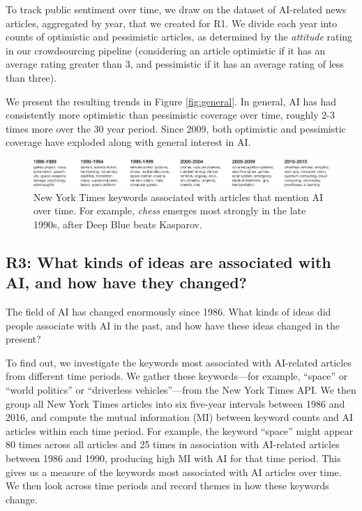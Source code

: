 \documentclass[letterpaper]{article}
\begin{document}
To track public sentiment over time, we draw on the dataset of AI-related news articles, aggregated by year, that we created for R1. We divide each year into counts of optimistic and pessimistic articles, as determined by the \textit{attitude} rating in our crowdsourcing pipeline (considering an article optimistic if it has an average rating greater than 3, and pessimistic if it has an average rating of less than three). %

We present the resulting trends in Figure \ref{fig:general}. In general, AI has had consistently more optimistic than pessimistic coverage over time, roughly 2-3 times more over the 30 year period. Since 2009, both optimistic and pessimistic coverage have exploded along with general interest in AI.

\begin{figure}[!t]
\centering
\includegraphics[width=2.0\columnwidth]{topics-over-time}
\caption{New York Times keywords associated with articles that mention AI over time. For example, \textit{chess} emerges most strongly in the late 1990s, after Deep Blue beats Kasparov.}
\label{fig:keywords}
\end{figure}

\subsection{R3: What kinds of ideas are associated with AI, and how have they changed?}

The field of AI has changed enormously since 1986. What kinds of ideas did people associate with AI in the past, and how have these ideas changed in the present?

To find out, we investigate the keywords most associated with AI-related articles from different time periods. We gather these keywords---for example, ``space'' or ``world politics'' or ``driverless vehicles''---from the New York Times API. We then group all New York Times articles into six five-year intervals between 1986 and 2016, and compute the mutual information (MI) between keyword counts and AI articles within each time period. For example, the keyword ``space'' might appear 80 times across all articles and 25 times in association with AI-related articles between 1986 and 1990, producing high MI with AI for that time period. This gives us a measure of the keywords most associated with AI articles over time. We then look across time periods and record themes in how these keywords change.
\end{document}
